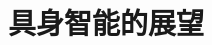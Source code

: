 \setcounter{chapter}{34}

\hypertarget{ux5177ux8eabux667aux80fdux7684ux5c55ux671b}{%
\chapter{具身智能的展望}\label{ux5177ux8eabux667aux80fdux7684ux5c55ux671b}}
